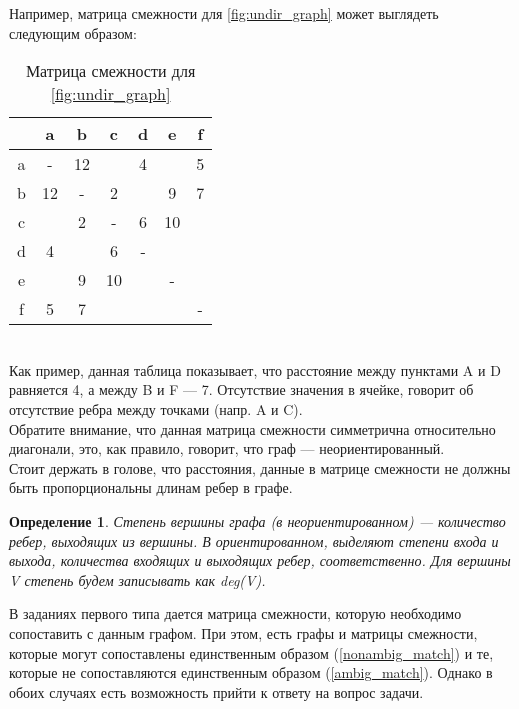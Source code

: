 \documentclass[12pt]{article}
\newtheorem{definition}{Определение}[section]
\theoremstyle{problem_style}
\begin{document}
Например, матрица смежности для \autoref{fig:undir_graph} может выглядеть следующим образом:
\begin{table}[h]
    \centering
    \begin{tabular}{c|cccccc}
         & a & b & c & d & e & f \\ \hline
        a & - & 12 &  & 4 &  & 5 \\
        b & 12 & - & 2 &  & 9 & 7 \\
        c &  & 2 & - & 6 & 10 &  \\
        d & 4 &  & 6 & - &  &  \\
        e &  & 9 & 10 &  & - &  \\
        f & 5 & 7 &  &  &  & - \\
    \end{tabular}
    \caption{Матрица смежности для \autoref{fig:undir_graph}}
    \label{tab:adjancency_matrix}
\end{table}\\
Как пример, данная таблица показывает, что расстояние между пунктами A и D равняется 4, а между B и F — 7. Отсутствие значения в ячейке, говорит об отсутствие ребра между точками (напр. A и C).\\
Обратите внимание, что данная матрица смежности симметрична относительно диагонали, это, как правило, говорит, что граф — неориентированный.\\
Стоит держать в голове, что расстояния, данные в матрице смежности не должны быть пропорциональны длинам ребер в графе.
\begin{definition}
Степень вершины графа (в неориентированном) — количество ребер, выходящих из вершины. В ориентированном, выделяют степени входа и выхода, количества входящих и выходящих ребер, соответственно. Для вершины \textit{V} степень будем записывать как \textit{deg(V)}.
\end{definition}

В заданиях первого типа дается матрица смежности, которую необходимо сопоставить с данным графом. При этом, есть графы и матрицы смежности, которые могут сопоставлены единственным образом (\ref{nonambig_match}) и те, которые не сопоставляются единственным образом (\ref{ambig_match}). Однако в обоих случаях есть возможность прийти к ответу на вопрос задачи.
\end{document}
